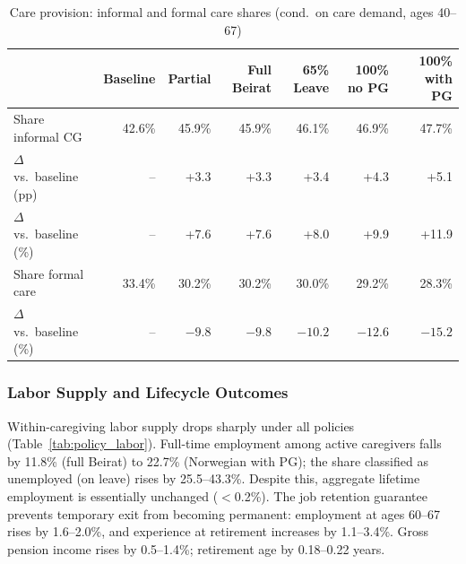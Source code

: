 \begin{table}[htbp]
  \centering
  \caption{Care provision: informal and formal care shares (cond.\ on care demand, ages 40--67)}
  \label{tab:policy_care}
  \small
  \begin{tabular}{lrrrrrr}
    \toprule
    & Baseline & Partial & Full Beirat & 65\% Leave & 100\% no PG & 100\% with PG \\
    \midrule
    Share informal CG & 42.6\% & 45.9\% & 45.9\% & 46.1\% & 46.9\% & 47.7\% \\
    $\Delta$ vs.\ baseline (pp) & -- & +3.3 & +3.3 & +3.4 & +4.3 & +5.1 \\
    $\Delta$ vs.\ baseline (\%) & -- & +7.6 & +7.6 & +8.0 & +9.9 & +11.9 \\
    Share formal care & 33.4\% & 30.2\% & 30.2\% & 30.0\% & 29.2\% & 28.3\% \\
    $\Delta$ vs.\ baseline (\%) & -- & $-9.8$ & $-9.8$ & $-10.2$ & $-12.6$ & $-15.2$ \\
    \bottomrule
  \end{tabular}
\end{table}

\subsubsection{Labor Supply and Lifecycle Outcomes}

Within-caregiving labor supply drops sharply under all policies (Table~\ref{tab:policy_labor}). Full-time employment among active caregivers falls by 11.8\% (full Beirat) to 22.7\% (Norwegian with PG); the share classified as unemployed (on leave) rises by 25.5--43.3\%. Despite this, aggregate lifetime employment is essentially unchanged ($<$0.2\%). The job retention guarantee prevents temporary exit from becoming permanent: employment at ages 60--67 rises by 1.6--2.0\%, and experience at retirement increases by 1.1--3.4\%. Gross pension income rises by 0.5--1.4\%; retirement age by 0.18--0.22 years.

